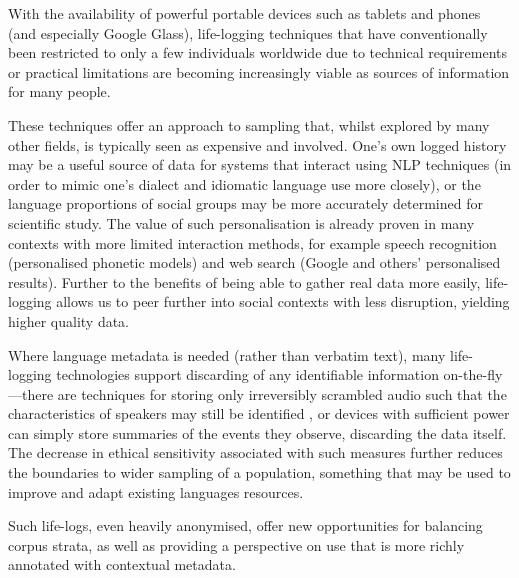 With the availability of powerful portable devices such as tablets and phones (and especially Google Glass), life-logging techniques that have conventionally been restricted to only a few individuals worldwide due to technical requirements or practical limitations are becoming increasingly viable as sources of information for many people.

These techniques offer an approach to sampling that, whilst explored by many other fields, is typically seen as expensive and involved.  One's own logged history may be a useful source of data for systems that interact using NLP techniques (in order to mimic one's dialect and idiomatic language use more closely), or the language proportions of social groups may be more accurately determined for scientific study.  The value of such personalisation is already proven in many contexts with more limited interaction methods, for example speech recognition (personalised phonetic models) and web search (Google and others' personalised results).  Further to the benefits of being able to gather real data more easily, life-logging allows us to peer further into social contexts with less disruption, yielding higher quality data.

Where language metadata is needed (rather than verbatim text), many life-logging technologies support discarding of any identifiable information on-the-fly---there are techniques for storing only irreversibly scrambled audio such that the characteristics of speakers may still be identified
\cite{lee2006voice}, or devices with sufficient power can simply store summaries of the events they observe, discarding the data itself.
The decrease in ethical sensitivity associated with such measures further reduces the boundaries to wider sampling of a population, something that may be used to improve and adapt existing languages resources.



Such life-logs, even heavily anonymised, offer new opportunities for balancing corpus strata, as well as providing a perspective on use that is more richly annotated with contextual metadata.





